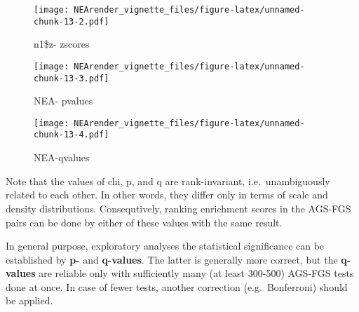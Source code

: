 \documentclass[]{article}
\newenvironment{Shaded}{\begin{snugshade}}{\end{snugshade}}
\newcommand{\KeywordTok}[1]{\textcolor[rgb]{0.13,0.29,0.53}{\textbf{#1}}}
\newcommand{\DataTypeTok}[1]{\textcolor[rgb]{0.13,0.29,0.53}{#1}}
\newcommand{\DecValTok}[1]{\textcolor[rgb]{0.00,0.00,0.81}{#1}}
\newcommand{\OperatorTok}[1]{\textcolor[rgb]{0.81,0.36,0.00}{\textbf{#1}}}
\newcommand{\NormalTok}[1]{#1}
\begin{document}
\begin{Shaded}
\end{Shaded}

\begin{figure}
\centering
\texttt{[image: NEArender\_vignette\_files/figure-latex/unnamed-chunk-13-2.pdf]}
\caption{n1\$z- zscores}
\end{figure}

\begin{Shaded}
\end{Shaded}

\begin{figure}
\centering
\texttt{[image: NEArender\_vignette\_files/figure-latex/unnamed-chunk-13-3.pdf]}
\caption{NEA- pvalues}
\end{figure}

\begin{Shaded}
\end{Shaded}

\begin{figure}
\centering
\texttt{[image: NEArender\_vignette\_files/figure-latex/unnamed-chunk-13-4.pdf]}
\caption{NEA-qvalues}
\end{figure}

Note that the values of chi, p, and q are rank-invariant,
i.e.~unambiguously related to each other. In other words, they differ
only in terms of scale and density distributions. Consequtively, ranking
enrichment scores in the AGS-FGS pairs can be done by either of these
values with the same result.

In general purpose, exploratory analyses the statistical significance
can be established by \textbf{p-} and \textbf{q-values}. The latter is
generally more correct, but the \textbf{q-values} are reliable only with
sufficiently many (at least 300-500) AGS-FGS tests done at once. In case
of fewer tests, another correction (e.g.~Bonferroni) should be applied.
\end{document}

